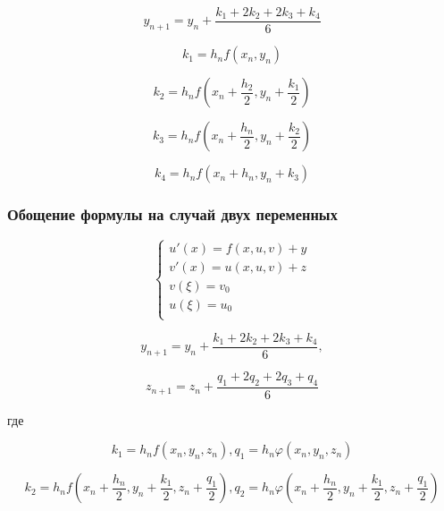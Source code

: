 \begin{equation*}
    y_{n+1} = y_n + \frac{k_1 + 2k_2 + 2k_3 + k_4}{6}
\end{equation*}

\begin{equation*}
    k_1 = h_n f(x_n, y_n)
\end{equation*}

\begin{equation*}
    k_2  =h_n f(x_n + \frac{h_2}{2}, y_n + \frac{k_1}{2})
\end{equation*}

\begin{equation*}
    k_3 = h_n f(x_n + \frac{h_n}{2}, y_n + \frac{k_2}{2})
\end{equation*}

\begin{equation*}
    k_4 = h_n f(x_n + h_n, y_n + k_3)
\end{equation*}

\subsubsection{Обощение формулы на случай двух переменных}

\begin{equation*}
    \begin{cases}
        u'(x) = f(x,u,v) + y \\
        v'(x) = u(x,u,v) + z \\
        v(\xi) = v_0 \\
        u(\xi) = u_0 \\
    \end{cases}
\end{equation*}

\begin{equation*}
    y_{n+1} = y_n + \frac{k_1 + 2k_2 + 2k_3 + k_4}{6},
\end{equation*}

\begin{equation*}
    z_{n+1} = z_n + \frac{q_1 + 2q_2 + 2q_3 + q_4}{6}
\end{equation*}

где

\begin{equation*}
    k_1 = h_n f(x_n, y_n, z_n), q_1 = h_n \varphi (x_n, y_n, z_n)
\end{equation*}

\begin{equation*}
    k_2 = h_n f (x_n + \frac{h_n}{2}, y_n + \frac{k_1}{2}, z_n + \frac{q_1}{2}), q_2 = h_n \varphi(x_n + \frac{h_n}{2}, y_n + \frac{k_1}{2}, z_n + \frac{q_1}{2})
\end{equation*}


